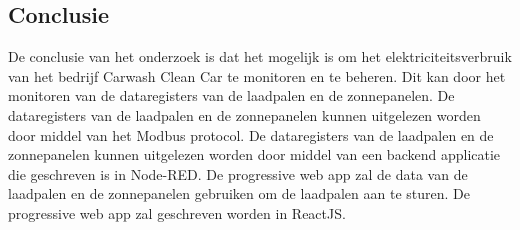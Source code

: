\subsection{Conclusie}%
\label{sub:conclusie}
De conclusie van het onderzoek is dat het mogelijk is om het elektriciteitsverbruik van het bedrijf Carwash Clean Car te monitoren en te beheren. Dit kan door het monitoren van de dataregisters van de laadpalen en de zonnepanelen. De dataregisters van de laadpalen en de zonnepanelen kunnen uitgelezen worden door middel van het Modbus protocol. De dataregisters van de laadpalen en de zonnepanelen kunnen uitgelezen worden door middel van een backend applicatie die geschreven is in Node-RED. De progressive web app zal de data van de laadpalen en de zonnepanelen gebruiken om de laadpalen aan te sturen. De progressive web app zal geschreven worden in ReactJS.